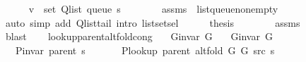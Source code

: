 \begin{isabellebody}
\ \ \ \ \isamarkupfalse%
\ {\isachardoublequoteopen}v\ {\isasymin}\ set\ {\isacharparenleft}{\kern0pt}Q{\isacharunderscore}{\kern0pt}list\ {\isacharparenleft}{\kern0pt}queue\ s{\isacharparenright}{\kern0pt}{\isacharparenright}{\kern0pt}{\isachardoublequoteclose}\isanewline
\ \ \ \ \ \ \isamarkupfalse%
\ assms{\isacharparenleft}{\kern0pt}{}{\isacharcomma}{\kern0pt}\ {}{\isacharparenright}{\kern0pt}\ list{\isacharunderscore}{\kern0pt}queue{\isacharunderscore}{\kern0pt}non{\isacharunderscore}{\kern0pt}empty\isanewline
\ \ \ \ \ \ \isamarkupfalse%
\ {\isacharparenleft}{\kern0pt}auto\ simp\ add{\isacharcolon}{\kern0pt}\ Q{\isachardot}{\kern0pt}list{\isacharunderscore}{\kern0pt}tail\ intro{\isacharcolon}{\kern0pt}\ list{\isachardot}{\kern0pt}set{\isacharunderscore}{\kern0pt}sel{\isacharparenleft}{\kern0pt}{}{\isacharparenright}{\kern0pt}{\isacharparenright}{\kern0pt}\isanewline
\ \ \ \ \isamarkupfalse%
\ {\isacharquery}{\kern0pt}thesis\isanewline
\ \ \ \ \ \ \isamarkupfalse%
\ assms{\isacharparenleft}{\kern0pt}{}{\isacharparenright}{\kern0pt}\isanewline
\ \ \ \ \ \ \isamarkupfalse%
\ blast\isanewline
\ \ \isamarkupfalse%
\isanewline
{}\isamarkupfalse%
%
\endisatagproof
{\isafoldproof}%
%
\isadelimproof
%
\endisadelimproof
%
\isadelimdocument
%
\endisadelimdocument
%
\isatagdocument
%
\isamarkuptrue%
%
\endisatagdocument
{\isafolddocument}%
%
\isadelimdocument
%
\endisadelimdocument
{}\isamarkupfalse%
\ lookup{\isacharunderscore}{\kern0pt}parent{\isacharunderscore}{\kern0pt}alt{\isacharunderscore}{\kern0pt}fold{\isacharunderscore}{\kern0pt}cong{\isacharcolon}{\kern0pt}\isanewline
\ \ \ {\isachardoublequoteopen}G{\isachardot}{\kern0pt}invar\ G{}{\isachardoublequoteclose}\isanewline
\ \ \ {\isachardoublequoteopen}G{\isachardot}{\kern0pt}invar\ G{}{\isachardoublequoteclose}\isanewline
\ \ \ {\isachardoublequoteopen}P{\isacharunderscore}{\kern0pt}invar\ {\isacharparenleft}{\kern0pt}parent\ s{\isacharparenright}{\kern0pt}{\isachardoublequoteclose}\isanewline
\ \ \isanewline
\ \ \ \ {\isachardoublequoteopen}P{\isacharunderscore}{\kern0pt}lookup\ {\isacharparenleft}{\kern0pt}parent\ {\isacharparenleft}{\kern0pt}alt{\isacharunderscore}{\kern0pt}fold\ G{}\ G{}\ src\ s{\isacharparenright}{\kern0pt}{\isacharparenright}{\kern0pt}\ {\isacharequal}{\kern0pt}\isanewline

\end{isabellebody}
